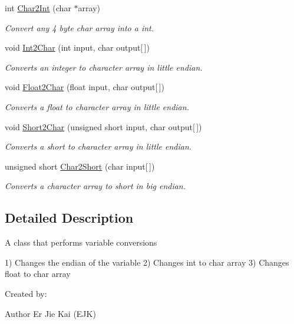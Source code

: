 \begin{DoxyCompactItemize}
int \mbox{\hyperlink{class_variable_conversion_a2a461a2be2edffa001a019022e5fc724}{Char2\+Int}} (char $\ast$array)
\begin{DoxyCompactList}\small\item\em Convert any 4 byte char array into a int. \end{DoxyCompactList}\item 
void \mbox{\hyperlink{class_variable_conversion_abdea4baadadd20db6bc80d366462ad4c}{Int2\+Char}} (int input, char output\mbox{[}$\,$\mbox{]})
\begin{DoxyCompactList}\small\item\em Converts an integer to character array in little endian. \end{DoxyCompactList}\item 
void \mbox{\hyperlink{class_variable_conversion_ab50543149570aba13c55c3488f155467}{Float2\+Char}} (float input, char output\mbox{[}$\,$\mbox{]})
\begin{DoxyCompactList}\small\item\em Converts a float to character array in little endian. \end{DoxyCompactList}\item 
void \mbox{\hyperlink{class_variable_conversion_a5b8d2ebcdb12c1233a586395bdddd18a}{Short2\+Char}} (unsigned short input, char output\mbox{[}$\,$\mbox{]})
\begin{DoxyCompactList}\small\item\em Converts a short to character array in little endian. \end{DoxyCompactList}\item 
unsigned short \mbox{\hyperlink{class_variable_conversion_aa6e6dc3e28b16a38ca77908cb97d0d2c}{Char2\+Short}} (char input\mbox{[}$\,$\mbox{]})
\begin{DoxyCompactList}\small\item\em Converts a character array to short in big endian. \end{DoxyCompactList}\end{DoxyCompactItemize}


\subsection{Detailed Description}
A class that performs variable conversions

1) Changes the endian of the variable 2) Changes int to char array 3) Changes float to char array

Created by\+: \begin{DoxyAuthor}{Author}
Er Jie Kai (E\+JK) 
\end{DoxyAuthor}


